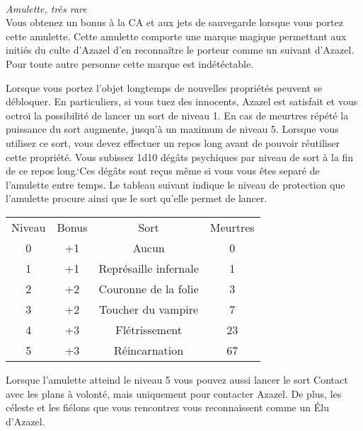 \\
{\small \it Amulette, très rare}\\
\label{AmuletteAzazel}
Vous obtenez un bonus à la CA et aux jets de sauvegarde lorsque vous 
portez cette amulette. Cette amulette comporte une marque magique permettant
aux initiés du culte d'Azazel d'en reconnaître le porteur comme un suivant
d'Azazel. Pour toute autre personne cette marque est indétéctable.

Lorsque vous portez l'objet longtemps de nouvelles propriétés peuvent se 
débloquer. En particuliers, si vous tuez des innocents, Azazel est satisfait 
et vous octroi la possibilité de lancer un sort de niveau 1. En cas de meurtres 
répété la puissance du sort augmente, jusqu'à un maximum de niveau 5.
Lorsque vous utilisez ce sort, vous devez effectuer un repos long avant de
pouvoir réutiliser cette propriété. Vous subissez 1d10 dégâts psychiques par niveau de sort à
la fin de ce repos long.`Ces dégâts sont 
reçus même si vous vous êtes separé de l'amulette entre temps.
Le tableau suivant indique le niveau de protection que l'amulette procure ainsi que
le sort qu'elle permet de lancer.

\begin{center}
\setlength{\tabcolsep}{4pt}
\begin{tabular}{cccc}
Niveau & Bonus & Sort & Meurtres \\
   \rowcolor{LightCyan}
 0 & +1 & Aucun & 0  \\
 1 & +1 & Représaille infernale & 1 \\
   \rowcolor{LightCyan}
 2 & +2 & Couronne de la folie & 3 \\
 3 & +2 & Toucher du vampire & 7 \\
   \rowcolor{LightCyan}
 4 & +3 & Flétrissement & 23 \\
 5 & +3 & Réincarnation & 67 \\
\end{tabular}
\end{center}

Lorsque l'amulette atteind le niveau 5 vous pouvez aussi lancer le sort Contact avec 
les plans à volonté, mais uniquement pour contacter Azazel. De plus, les céleste et les fiélons 
que vous rencontrez vous reconnaissent comme un Élu d'Azazel.
